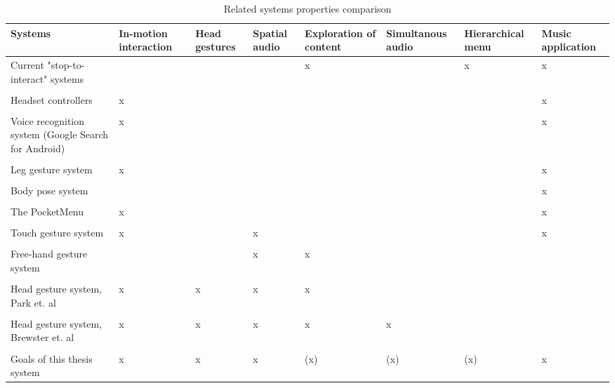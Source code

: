 \begin{table}[b] 
\scriptsize
\caption{Related systems properties comparison} %
\begin{tabular}{L{2.2cm}C{1.5cm}C{1.3cm}C{1.3cm}C{1.5cm}C{1.5cm}C{1.5cm}C{1.5cm}} \toprule
	Systems & In-motion interaction & Head gestures & Spatial audio & Exploration of content & Simultanous audio & Hierarchical menu & Music application \\ \midrule
    Current "stop-to-interact" systems   &  &  &  & x &  & x & x \\
    \\
    Headset controllers   & x &  &  &  &  &  & x \\
    \\
    Voice recognition system (Google Search for Android)   & x &  &  &  &  &  & x \\
    \\
	Leg gesture system \cite{smus_running_2010}   & x &  &  &  &  &  & x \\ %
	\\
	Body pose system \cite{strachan_bodyspace_2007}   &  &   &  &  &  &  & x \\
	\\
	The PocketMenu \cite{pielot_pocketmenu:_2012}   & x &  &  &  &  &  & x \\
	\\
	Touch gesture system \cite{pirhonen_gestural_2002}   & x &  & x &  &  &  & x \\
	\\
	Free-hand gesture system \cite{kajastila_interaction_2013}   &  &  & x & x &  &  &  \\
	\\
	Head gesture system, Park et. al \cite{park_gaze-directed_2011}   & x & x & x & x &  &  &  \\
	\\
	Head gesture system, Brewster et. al \cite{brewster_multimodaleyes-freeinteraction_2003}   & x & x & x & x & x &  &   \\
	\\
	Goals of this thesis system   & x & x & x & (x) & (x) & (x) & x \\ \bottomrule
\end{tabular}

\label{tab:related} 
\end{table}

